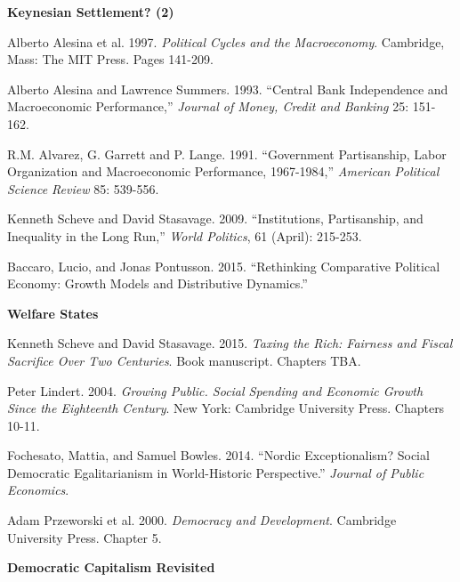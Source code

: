 \documentclass[letterpaper]{article}
\renewenvironment{itemize}{
  \begin{list}{}{
    \setlength{\leftmargin}{1.5em}
  }
}{
  \end{list}
}
\begin{document}
\begin{enumerate}
\item {\bf Keynesian Settlement? (2)}

	\begin{itemize}
		\item[$\bullet$] Alberto Alesina et al. 1997. \emph{Political Cycles and the Macroeconomy}. Cambridge, Mass: The MIT Press. Pages 141-209. 
		\item[$\bullet$] Alberto Alesina and Lawrence Summers. 1993. ``Central Bank Independence and Macroeconomic Performance,'' \emph{Journal of Money, Credit and Banking} 25: 151-162.
		\item[$\bullet$] R.M. Alvarez, G. Garrett and P. Lange. 1991. ``Government Partisanship, Labor Organization and Macroeconomic Performance, 1967-1984,'' \emph{American Political Science Review} 85: 539-556.
		\item[$\bullet$] Kenneth Scheve and David Stasavage. 2009. ``Institutions, Partisanship, and Inequality in the Long Run,'' \emph{World Politics}, 61 (April): 215-253.
		\item[$\bullet$] Baccaro, Lucio, and Jonas Pontusson. 2015. ``Rethinking Comparative Political Economy: Growth Models and Distributive Dynamics.''
	\end{itemize}

\item {\bf Welfare States}

	\begin{itemize}
		\item[$\bullet$] Kenneth Scheve and David Stasavage. 2015. \emph{Taxing the Rich: Fairness and Fiscal Sacrifice Over Two Centuries}. Book manuscript. Chapters TBA.
		\item[$\bullet$] Peter Lindert. 2004. \emph{Growing Public. Social Spending and Economic Growth Since the Eighteenth Century}. New York: Cambridge University Press. Chapters 10-11.
		\item[$\bullet$] Fochesato, Mattia, and Samuel Bowles. 2014. ``Nordic Exceptionalism? Social Democratic Egalitarianism in World-Historic Perspective.'' \emph{Journal of Public Economics}.
		\item[$\bullet$] Adam Przeworski et al. 2000. \emph{Democracy and Development}. Cambridge University Press. Chapter 5. 
	\end{itemize}

\item {\bf Democratic Capitalism Revisited}


\end{enumerate}
\end{document}
